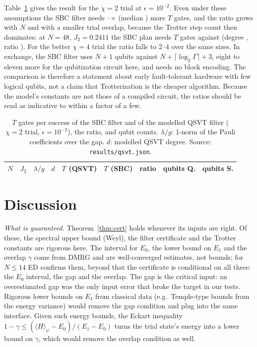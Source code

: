 \documentclass[aps,pra,twocolumn,superscriptaddress,nofootinbib]{revtex4-2}
\begin{document}
Table~\ref{tab:qsvt} gives the result for the $\chi=2$ trial at $\epsilon=10^{-2}$. Even under these assumptions the SBC filter needs \qsvtRatioMin--\qsvtRatioMax$\times$ (median \qsvtRatioMed) more $T$ gates, and the ratio grows with $N$
and with a smaller trial overlap, because the Trotter step count then dominates: at $N=48$, $J_2=0.2411$ the SBC plan needs \tFortyEight{} $T$ gates against \qsvtTFortyEight{} (degree \qsvtDegFortyEight, ratio \qsvtRatioFortyEight). For the better $\chi=4$ trial the ratio falls to
2--4 over the same sizes. In exchange, the SBC filter uses $N+1$ qubits against $N+\lceil\log_2\Gamma\rceil+3$, eight to eleven more for the qubitization circuit here, and needs no block encoding. The comparison is therefore a statement about early fault-tolerant hardware
with few logical qubits, not a claim that Trotterization is the cheaper algorithm. Because the model's constants are not those of a compiled circuit, the ratios should be read as indicative to within a factor of a few.

\begin{table}[t]
\caption{$T$ gates per success of the SBC filter and of the modelled QSVT filter ($\chi=2$ trial, $\epsilon=10^{-2}$), the ratio, and qubit counts. $\lambda/g$: 1-norm of the Pauli coefficients over the gap.
$d$: modelled QSVT degree. Source: \texttt{results/qsvt.json}.}
\label{tab:qsvt}
\begin{ruledtabular}
\begin{tabular}{rrrrrrrrr}
$N$ & $J_2$ & $\lambda/g$ & $d$ & $T$ (QSVT) & $T$ (SBC) & ratio & qubits Q. & qubits S.\\
\midrule

\end{tabular}
\end{ruledtabular}
\end{table}

\section{Discussion}

\emph{What is guaranteed.} Theorem~\ref{thm:cert} holds whenever its inputs are right. Of these, the
spectral upper bound (Weyl), the filter certificate and the Trotter constants are rigorous here. The
interval for $E_0$, the lower bound on $E_1$ and the overlap $\gamma$ come from DMRG and are
well-converged estimates, not bounds; for $N\le14$ ED confirms them, beyond that the certificate is
conditional on all three: the $E_0$ interval, the gap and the overlap. The gap is the critical input: an overestimated gap was the only input error that
broke the target in our tests. Rigorous lower bounds on $E_1$ from classical data
(e.g.\ Temple-type bounds from the energy variance) would remove the gap condition and plug into the
same interface. Given such energy bounds, the Eckart inequality
$1-\gamma\le(\langle H\rangle_\psi-E_0)/(E_1-E_0)$ turns the trial state's energy into a lower bound on
$\gamma$, which would remove the overlap condition as well.
\end{document}
